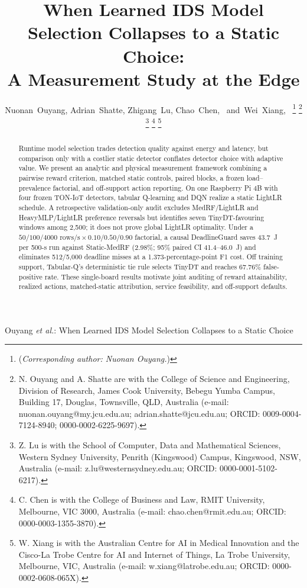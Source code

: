 \documentclass[journal]{IEEEtran}
\begin{document}
\title{When Learned IDS Model Selection Collapses to a Static Choice:\\A Measurement Study at the Edge}
\author{Nuonan~Ouyang,
        Adrian~Shatte,
        Zhigang~Lu,
        Chao~Chen,~
        and~Wei~Xiang,~%
\thanks{(\textit{Corresponding author: Nuonan Ouyang.})}%
\thanks{N. Ouyang and A. Shatte are with the College of Science and Engineering, Division of Research, James Cook University, Bebegu Yumba Campus, Building 17, Douglas, Townsville, QLD, Australia (e-mail: nuonan.ouyang@my.jcu.edu.au; adrian.shatte@jcu.edu.au; ORCID: 0009-0004-7124-8940; 0000-0002-6225-9697).}%
\thanks{Z. Lu is with the School of Computer, Data and Mathematical Sciences, Western Sydney University, Penrith (Kingswood) Campus, Kingswood, NSW, Australia (e-mail: z.lu@westernsydney.edu.au; ORCID: 0000-0001-5102-6217).}%
\thanks{C. Chen is with the College of Business and Law, RMIT University, Melbourne, VIC 3000, Australia (e-mail: chao.chen@rmit.edu.au; ORCID: 0000-0003-1355-3870).}%
\thanks{W. Xiang is with the Australian Centre for AI in Medical Innovation and the Cisco-La Trobe Centre for AI and Internet of Things, La Trobe University, Melbourne, VIC, Australia (e-mail: w.xiang@latrobe.edu.au; ORCID: 0000-0002-0608-065X).}%
}
%
{Ouyang \MakeLowercase{\textit{et al.}}: When Learned IDS Model Selection Collapses to a Static Choice}
\maketitle
\begin{abstract}
Runtime model selection trades detection quality against energy and latency, but comparison only with a costlier static detector conflates detector choice with adaptive value. We present an analytic and physical measurement framework combining a pairwise reward criterion, matched static controls, paired blocks, a frozen load--prevalence factorial, and off-support action reporting. On one Raspberry Pi 4B with four frozen TON-IoT detectors, tabular Q-learning and DQN realize a static LightLR schedule. A retrospective validation-only audit excludes MedRF/LightLR and HeavyMLP/LightLR preference reversals but identifies seven TinyDT-favouring windows among 2,500; it does not prove global LightLR optimality. Under a $50/100/4000\text{ rows/s}\times0.10/0.50/0.90$ factorial, a causal DeadlineGuard saves 43.7~J per 500-s run against Static-MedRF (2.98\%; 95\% paired CI 41.4--46.0~J) and eliminates 512/5,000 deadline misses at a 1.373-percentage-point F1 cost. Off training support, Tabular-Q's deterministic tie rule selects TinyDT and reaches 67.76\% false-positive rate. These single-board results motivate joint auditing of reward attainability, realized actions, matched-static attribution, service feasibility, and off-support defaults.
\end{abstract}
\end{document}
